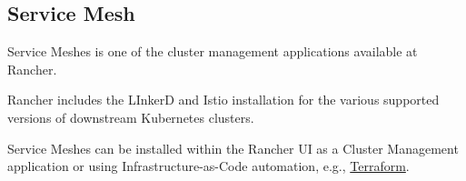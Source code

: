 \subsection{Service Mesh}

Service Meshes is one of the cluster management applications available at Rancher.

Rancher includes the LInkerD and Istio installation for the various supported versions of downstream Kubernetes clusters.

Service Meshes can be installed within the Rancher UI as a Cluster Management application or using Infrastructure-as-Code automation, e.g., \href{https://www.terraform.io/}{Terraform}.

